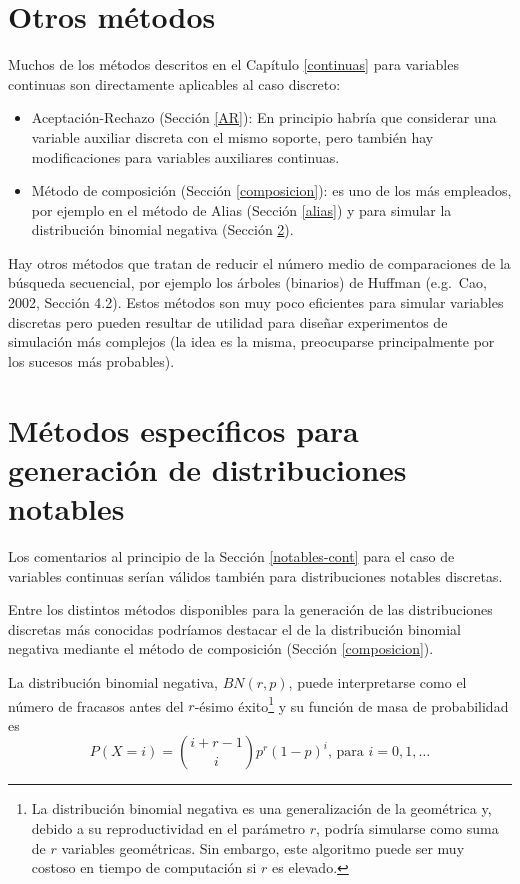 \documentclass[
]{book}
\theoremstyle{break}
\theoremstyle{nonumberplain}
\begin{document}
\hypertarget{otros-muxe9todos}{%
\section{Otros métodos}\label{otros-muxe9todos}}

Muchos de los métodos descritos en el Capítulo \ref{continuas} para variables continuas son directamente aplicables al caso discreto:

\begin{itemize}
\item
  Aceptación-Rechazo (Sección \ref{AR}): En principio habría que considerar una variable auxiliar discreta con el mismo soporte, pero también hay modificaciones para variables auxiliares continuas.
\item
  Método de composición (Sección \ref{composicion}): es uno de los más empleados, por ejemplo en el método de Alias (Sección \ref{alias}) y para simular la distribución binomial negativa (Sección \ref{notables-disc}).
\end{itemize}

Hay otros métodos que tratan de reducir el número medio de comparaciones de la búsqueda secuencial, por ejemplo los árboles (binarios) de Huffman (e.g.~Cao, 2002, Sección 4.2).
Estos métodos son muy poco eficientes para simular variables discretas pero pueden resultar de utilidad para diseñar experimentos de simulación más complejos (la idea es la misma, preocuparse principalmente por los sucesos más probables).

\hypertarget{notables-disc}{%
\section{Métodos específicos para generación de distribuciones notables}\label{notables-disc}}

Los comentarios al principio de la Sección \ref{notables-cont} para el caso de variables continuas serían válidos también para distribuciones notables discretas.

Entre los distintos métodos disponibles para la generación de las distribuciones discretas más conocidas podríamos destacar el de la distribución binomial negativa mediante el método de composición (Sección \ref{composicion}).

La distribución binomial negativa, \(BN(r, p)\), puede interpretarse como el número de fracasos antes del \(r\)-ésimo éxito\footnote{La distribución binomial negativa es una generalización de la geométrica y, debido a su reproductividad en el parámetro \(r\), podría simularse como suma de \(r\) variables geométricas. Sin embargo, este algoritmo puede ser muy costoso en tiempo de computación si \(r\) es elevado.} y su función de masa de probabilidad es
\[P(X = i) = \binom{i+r-1}i p^r (1-p)^i \text{, para }i=0,1,\ldots\]
\end{document}
